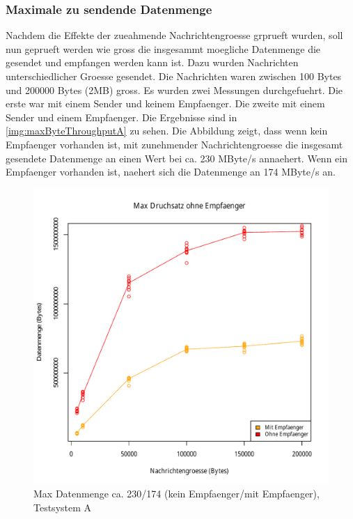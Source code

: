 \subsubsection{Maximale zu sendende Datenmenge}
\label{sec:maxthroughput}
Nachdem die Effekte der zueahmende Nachrichtengroesse grprueft wurden, soll nun geprueft werden wie gross die insgesammt moegliche Datenmenge die gesendet und empfangen werden kann ist. Dazu wurden Nachrichten unterschiedlicher Groesse gesendet. Die Nachrichten waren zwischen 100 Bytes und 200000 Bytes (2MB) gross. Es wurden zwei Messungen durchgefuehrt. Die erste war mit einem Sender und keinem Empfaenger. Die zweite mit einem Sender und einem Empfaenger. 
Die Ergebnisse sind in \autoref{img:maxByteThroughputA} zu sehen. Die Abbildung zeigt, dass wenn kein Empfaenger vorhanden ist, mit zunehmender Nachrichtengroesse die insgesamt gesendete Datenmenge an einen Wert bei ca. 230 MByte/s annaehert. Wenn ein Empfaenger vorhanden ist, naehert sich die Datenmenge an 174 MByte/s an.
\begin{figure}
\center
  \includegraphics[width=1\textwidth]{images/measurement/rate-limit-unlimited-consumer-vs-no-consumer.pdf}
  \caption{Max Datenmenge ca. 230/174 (kein Empfaenger/mit Empfaenger), Testsystem A}
  \label{img:maxByteThroughputA}
\end{figure}

